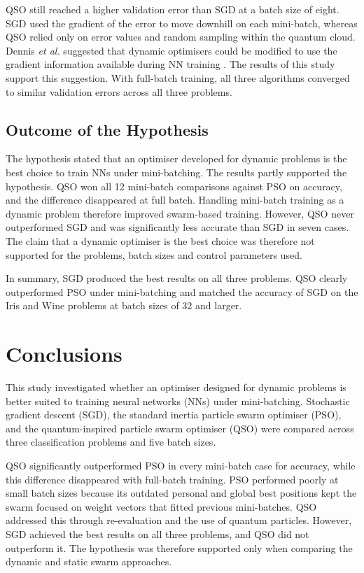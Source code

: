 \documentclass[conference]{IEEEtran}
\begin{document}
QSO still reached a higher validation error than SGD at a batch size of eight. 
SGD used the gradient of the error to move downhill on each mini-batch, 
whereas QSO relied only on error values and random sampling within the 
quantum cloud. Dennis \textit{et al.} suggested that dynamic optimisers could 
be modified to use the gradient information available during NN training \cite{dennis2021}. The 
results of this study support this suggestion. With full-batch training, all 
three algorithms converged to similar validation errors across all three 
problems.

\subsection{Outcome of the Hypothesis}
The hypothesis stated that an optimiser developed for dynamic
problems is the best choice to train NNs under mini-batching. The
results partly supported the hypothesis. QSO won all 12 mini-batch
comparisons against PSO on accuracy, and the difference disappeared
at full batch. Handling mini-batch training as a dynamic problem
therefore improved swarm-based training. However, QSO never
outperformed SGD and was significantly less accurate than SGD in
seven cases. The claim that a dynamic optimiser is the best choice
was therefore not supported for the problems, batch sizes and control
parameters used.

In summary, SGD produced the best results on all three problems. QSO
clearly outperformed PSO under mini-batching and matched the accuracy
of SGD on the Iris and Wine problems at batch sizes of 32 and larger.

\section{Conclusions}
\label{sec:concl}
This study investigated whether an optimiser designed for dynamic problems is 
better suited to training neural networks (NNs) under mini-batching. 
Stochastic gradient descent (SGD), the standard inertia particle swarm 
optimiser (PSO), and the quantum-inspired particle swarm optimiser (QSO) 
were compared across three classification problems and five batch sizes.

QSO significantly outperformed PSO in every mini-batch case for accuracy, 
while this difference disappeared with full-batch training. PSO performed 
poorly at small batch sizes because its outdated personal and global best 
positions kept the swarm focused on weight vectors that fitted previous 
mini-batches. QSO addressed this through re-evaluation and the use of 
quantum particles. However, SGD achieved the best results on all three 
problems, and QSO did not outperform it. The hypothesis was therefore 
supported only when comparing the dynamic and static swarm approaches.
\end{document}

